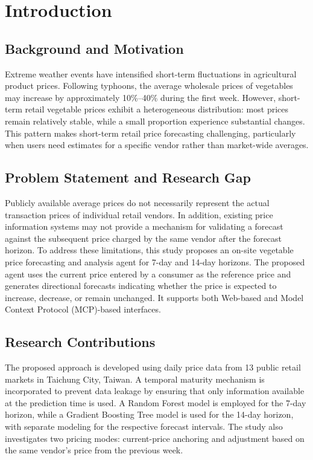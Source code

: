 \section{Introduction}\label{sec:intro}

\subsection{Background and Motivation}
Extreme weather events have intensified short-term fluctuations in agricultural product prices. Following typhoons, the average wholesale prices of vegetables may increase by approximately 10\%--40\% during the first week. However, short-term retail vegetable prices exhibit a heterogeneous distribution: most prices remain relatively stable, while a small proportion experience substantial changes. This pattern makes short-term retail price forecasting challenging, particularly when users need estimates for a specific vendor rather than market-wide averages.

\subsection{Problem Statement and Research Gap}
Publicly available average prices do not necessarily represent the actual transaction prices of individual retail vendors. In addition, existing price information systems may not provide a mechanism for validating a forecast against the subsequent price charged by the same vendor after the forecast horizon. To address these limitations, this study proposes an on-site vegetable price forecasting and analysis agent for 7-day and 14-day horizons. The proposed agent uses the current price entered by a consumer as the reference price and generates directional forecasts indicating whether the price is expected to increase, decrease, or remain unchanged. It supports both Web-based and Model Context Protocol (MCP)-based interfaces.

\subsection{Research Contributions}
The proposed approach is developed using daily price data from 13 public retail markets in Taichung City, Taiwan. A temporal maturity mechanism is incorporated to prevent data leakage by ensuring that only information available at the prediction time is used. A Random Forest model is employed for the 7-day horizon, while a Gradient Boosting Tree model is used for the 14-day horizon, with separate modeling for the respective forecast intervals. The study also investigates two pricing modes: current-price anchoring and adjustment based on the same vendor's price from the previous week.

